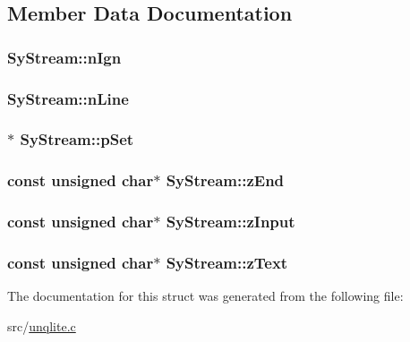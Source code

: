 \subsection{Member Data Documentation}
\hypertarget{struct_sy_stream_a467ff3e158480ea2e6a9624981739997}{
\subsubsection[{n\-Ign}]{ Sy\-Stream\-::n\-Ign}}\label{d2/d3d/struct_sy_stream_a467ff3e158480ea2e6a9624981739997}
\hypertarget{struct_sy_stream_a1d8f5169a8dede1b23fe7414bad069e3}{
\subsubsection[{n\-Line}]{ Sy\-Stream\-::n\-Line}}\label{d2/d3d/struct_sy_stream_a1d8f5169a8dede1b23fe7414bad069e3}
\hypertarget{struct_sy_stream_ab1e9ea75226a6980ed6424ecdb42742d}{
\subsubsection[{p\-Set}]{$\ast$ Sy\-Stream\-::p\-Set}}\label{d2/d3d/struct_sy_stream_ab1e9ea75226a6980ed6424ecdb42742d}
\hypertarget{struct_sy_stream_abb89b218eab35e23bc8a5e890c7e5f4b}{
\subsubsection[{z\-End}]{\setlength{\rightskip}{0pt plus 5cm}const unsigned char$\ast$ Sy\-Stream\-::z\-End}}\label{d2/d3d/struct_sy_stream_abb89b218eab35e23bc8a5e890c7e5f4b}
\hypertarget{struct_sy_stream_ae2b6e8c79b3f669cb7d11fdd55e7de21}{
\subsubsection[{z\-Input}]{\setlength{\rightskip}{0pt plus 5cm}const unsigned char$\ast$ Sy\-Stream\-::z\-Input}}\label{d2/d3d/struct_sy_stream_ae2b6e8c79b3f669cb7d11fdd55e7de21}
\hypertarget{struct_sy_stream_a7b5cbcd1b335e0b84c57c67ed78c0b06}{
\subsubsection[{z\-Text}]{\setlength{\rightskip}{0pt plus 5cm}const unsigned char$\ast$ Sy\-Stream\-::z\-Text}}\label{d2/d3d/struct_sy_stream_a7b5cbcd1b335e0b84c57c67ed78c0b06}


The documentation for this struct was generated from the following file\-:\begin{DoxyCompactItemize}
\item 
src/\hyperlink{unqlite_8c}{unqlite.\-c}\end{DoxyCompactItemize}
